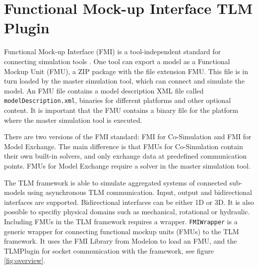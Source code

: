 \chapter{Functional Mock-up Interface TLM Plugin}
Functional Mock-up Interface (FMI) is a tool-independent standard for connecting simulation tools \cite{blochwitz2009}. 
One tool can export a model as a Functional Mockup Unit (FMU), a ZIP package with the file extension FMU. 
This file is in turn loaded by the master simulation tool, which can connect and simulate the model.
An FMU file contains a model description XML file called \texttt{modelDescription.xml}, binaries for different platforms and other optional content.
It is important that the FMU contains a binary file for the platform where the master simulation tool is executed.

There are two versions of the FMI standard: FMI for Co-Simulation and FMI for Model Exchange.
The main difference is that FMUs for Co-Simulation contain their own built-in solvers, and only exchange data at predefined communication points.
FMUs for Model Exchange require a solver in the master simulation tool.

The TLM framework is able to simulate aggregated systems of connected sub-models using asynchronous TLM communication. 
Input, output and bidirectional interfaces are supported.
Bidirectional interfaces can be either 1D or 3D.
It is also possible to specifiy physical domains such as mechanical, rotational or hydraulic.
Including FMUs in the TLM framework requires a wrapper.
\texttt{FMIWrapper} is a generic wrapper for connecting functional mockup units (FMUs) to the TLM framework.
It uses the FMI Library from Modelon \cite{modelon2015} to load an FMU, and the TLMPlugin for socket communication with the framework, see figure \ref{fig:overview}.

